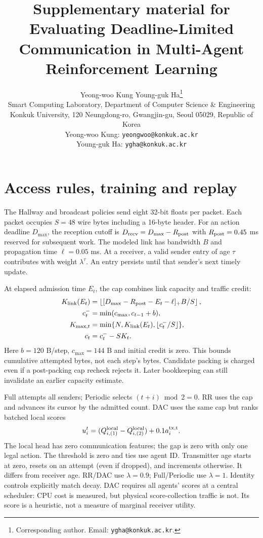 \documentclass[10pt,a4paper]{article}
\title{\fontsize{17.28pt}{22pt}\selectfont Supplementary material for\\Evaluating Deadline-Limited Communication in Multi-Agent Reinforcement Learning}
\author{\normalsize Yeong-woo Kung \quad Young-guk Ha\thanks{Corresponding author. Email: \texttt{ygha@konkuk.ac.kr}.}\\[3pt]
\small Smart Computing Laboratory, Department of Computer Science \& Engineering\\
\small Konkuk University, 120 Neungdong-ro, Gwangjin-gu, Seoul 05029, Republic of Korea\\
\small Yeong-woo Kung: \texttt{yeongwoo@konkuk.ac.kr}\\
\small Young-guk Ha: \texttt{ygha@konkuk.ac.kr}}
\date{}
\begin{document}
\maketitle
\section{Access rules, training and replay}\label{app:settings}
The Hallway and broadcast policies send eight 32-bit floats per packet. Each packet occupies $S=48$ wire bytes including a 16-byte header. For an action deadline $D_{\max}$, the reception cutoff is $D_{\rm recv}=D_{\max}-R_{\rm post}$ with $R_{\rm post}=0.45$ ms reserved for subsequent work. The modeled link has bandwidth $B$ and propagation time $\ell=0.05$ ms. At a receiver, a valid sender entry of age $\tau$ contributes with weight $\lambda^\tau$. An entry persists until that sender's next timely update.

At elapsed admission time $E_t$, the cap combines link capacity and traffic credit:
\begin{align}
 K_{\rm link}(E_t)&=\left\lfloor [D_{\max}-R_{\rm post}-E_t-\ell]_+B/S\right\rfloor,\label{eq:cap}\\
 c_t^-&=\min(c_{\max},c_{t-1}+b),\nonumber\\ K_{\max,t}&=\min\{N,K_{\rm link}(E_t),\lfloor c_t^-/S\rfloor\},\\
 c_t&=c_t^- - SK_t.
\end{align}
Here $b=120$ B/step, $c_{\max}=144$ B and initial credit is zero. This bounds cumulative attempted bytes, not each step's bytes. Candidate packing is charged even if a post-packing cap recheck rejects it. Later bookkeeping can still invalidate an earlier capacity estimate.

Full attempts all senders; Periodic selects $(t+i)\bmod2=0$. RR uses the cap and advances its cursor by the admitted count. DAC uses the same cap but ranks batched local scores
\begin{equation}
 u_i^t=(Q_{i,(1)}^{\rm local}-Q_{i,(2)}^{\rm local})+0.1a_i^{\rm tx,t}.
\end{equation}
The local head has zero communication features; the gap is zero with only one legal action. The threshold is zero and ties use agent ID. Transmitter age starts at zero, resets on an attempt (even if dropped), and increments otherwise. It differs from receiver age. RR/DAC use $\lambda=0.9$; Full/Periodic use $\lambda=1$. Identity controls explicitly match decay. DAC requires all agents' scores at a central scheduler: CPU cost is measured, but physical score-collection traffic is not. Its score is a heuristic, not a measure of marginal receiver utility.
\end{document}
